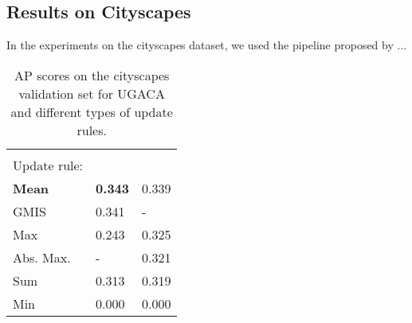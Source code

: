 \subsection{Results on Cityscapes}
In the experiments on the cityscapes dataset, we used the pipeline proposed by \cite{liu2018affinity} ...
\begin{table}
    \centering
    \begin{subtable}[t!]{0.5\textwidth}\centering
        \begin{tabular}{l M{0.25\textwidth} M{0.25\textwidth}}
        \toprule
        &  \\
        Update rule: &  &  \\ \midrule
\textbf{Mean}& \textbf{0.343}  & 0.339  \\
GMIS \cite{liu2018affinity} & 0.341 & -  \\
Max &   0.243  &   0.325  \\
Abs. Max. \cite{wolf2018mutex}  & -  & 0.321 \\
Sum \cite{levinkov2017comparative} & 0.313  & 0.319  \\
Min &  0.000    & 0.000  \\
        \end{tabular}
    \end{subtable} 
    \caption{AP scores on the cityscapes validation set for UGACA and different types of update rules.  }
    \label{tab:results_cityscapes}
\end{table}



